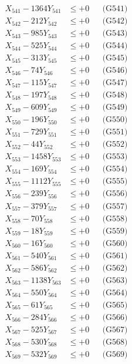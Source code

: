 \documentclass[a4paper,10pt]{article}
\begin{document}
{\begin{align}
\allowbreak
X_{541} - 1364Y_{541} &\leq +0 && \text{(G541)} \\
X_{542} - 212Y_{542} &\leq +0 && \text{(G542)} \\
X_{543} - 985Y_{543} &\leq +0 && \text{(G543)} \\
X_{544} - 525Y_{544} &\leq +0 && \text{(G544)} \\
X_{545} - 313Y_{545} &\leq +0 && \text{(G545)} \\
X_{546} - 74Y_{546} &\leq +0 && \text{(G546)} \\
X_{547} - 115Y_{547} &\leq +0 && \text{(G547)} \\
X_{548} - 197Y_{548} &\leq +0 && \text{(G548)} \\
X_{549} - 609Y_{549} &\leq +0 && \text{(G549)} \\
X_{550} - 196Y_{550} &\leq +0 && \text{(G550)} \\
\allowbreak
X_{551} - 729Y_{551} &\leq +0 && \text{(G551)} \\
X_{552} - 44Y_{552} &\leq +0 && \text{(G552)} \\
X_{553} - 1458Y_{553} &\leq +0 && \text{(G553)} \\
X_{554} - 169Y_{554} &\leq +0 && \text{(G554)} \\
X_{555} - 1112Y_{555} &\leq +0 && \text{(G555)} \\
X_{556} - 239Y_{556} &\leq +0 && \text{(G556)} \\
X_{557} - 379Y_{557} &\leq +0 && \text{(G557)} \\
X_{558} - 70Y_{558} &\leq +0 && \text{(G558)} \\
X_{559} - 18Y_{559} &\leq +0 && \text{(G559)} \\
X_{560} - 16Y_{560} &\leq +0 && \text{(G560)} \\
\allowbreak
X_{561} - 540Y_{561} &\leq +0 && \text{(G561)} \\
X_{562} - 586Y_{562} &\leq +0 && \text{(G562)} \\
X_{563} - 1138Y_{563} &\leq +0 && \text{(G563)} \\
X_{564} - 550Y_{564} &\leq +0 && \text{(G564)} \\
X_{565} - 61Y_{565} &\leq +0 && \text{(G565)} \\
X_{566} - 284Y_{566} &\leq +0 && \text{(G566)} \\
X_{567} - 525Y_{567} &\leq +0 && \text{(G567)} \\
X_{568} - 530Y_{568} &\leq +0 && \text{(G568)} \\
X_{569} - 532Y_{569} &\leq +0 && \text{(G569)} \\

\end{align}}
\end{document}
